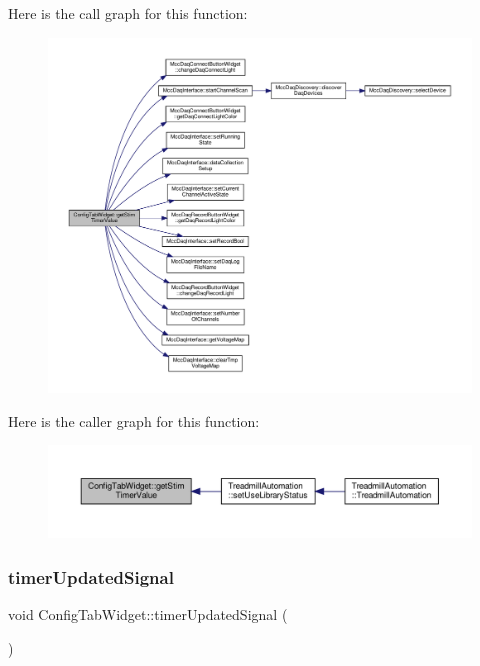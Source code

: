 Here is the call graph for this function\+:
\nopagebreak
\begin{figure}[H]
\begin{center}
\leavevmode
\includegraphics[width=350pt]{class_config_tab_widget_a783fb40a272c4a2fb3053da07955db0d_cgraph}
\end{center}
\end{figure}
Here is the caller graph for this function\+:
\nopagebreak
\begin{figure}[H]
\begin{center}
\leavevmode
\includegraphics[width=350pt]{class_config_tab_widget_a783fb40a272c4a2fb3053da07955db0d_icgraph}
\end{center}
\end{figure}
\mbox{\label{class_config_tab_widget_abad08be885f5a573aaf03da16bcd69ef}} 
\subsubsection{\texorpdfstring{timer\+Updated\+Signal}{timerUpdatedSignal}}
{\footnotesize\ttfamily void Config\+Tab\+Widget\+::timer\+Updated\+Signal (\begin{DoxyParamCaption}{ }\end{DoxyParamCaption})\hspace{0.3cm}{\ttfamily [signal]}}

